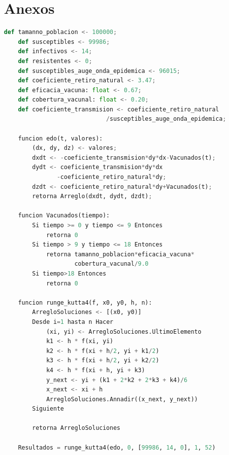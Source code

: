 \documentclass{wscpaperproc}
\theoremstyle{wsc}
\begin{document}
\appendix

\clearpage
\section{Anexos} \label{app:quadratic}
\begin{lstlisting}[language=python]
	def tamanno_poblacion <- 100000;
	def susceptibles <- 99986;
	def infectivos <- 14;
	def resistentes <- 0;
	def susceptibles_auge_onda_epidemica <- 96015;
	def coeficiente_retiro_natural <- 3.47;
	def eficacia_vacuna: float <- 0.67;
	def cobertura_vacunal: float <- 0.20;
	def coeficiente_transmision <- coeficiente_retiro_natural
		                     /susceptibles_auge_onda_epidemica;
	
	funcion edo(t, valores):
	 	(dx, dy, dz) <- valores;
		dxdt <- -coeficiente_transmision*dy*dx-Vacunados(t);
		dydt <- coeficiente_transmision*dy*dx
			   -coeficiente_retiro_natural*dy;
		dzdt <- coeficiente_retiro_natural*dy+Vacunados(t);
		retorna Arreglo(dxdt, dydt, dzdt);
	
	funcion Vacunados(tiempo):
		Si tiempo >= 0 y tiempo <= 9 Entonces
			retorna 0
		Si tiempo > 9 y tiempo <= 18 Entonces
			retorna tamanno_poblacion*eficacia_vacuna*
					cobertura_vacunal/9.0
		Si tiempo>18 Entonces
			retorna 0
	
	funcion runge_kutta4(f, x0, y0, h, n):
		ArregloSoluciones <- [(x0, y0)]
		Desde i=1 hasta n Hacer
			(xi, yi) <- ArregloSoluciones.UltimoElemento
			k1 <- h * f(xi, yi)
			k2 <- h * f(xi + h/2, yi + k1/2)
			k3 <- h * f(xi + h/2, yi + k2/2)
			k4 <- h * f(xi + h, yi + k3)
			y_next <- yi + (k1 + 2*k2 + 2*k3 + k4)/6
			x_next <- xi + h
			ArregloSoluciones.Annadir((x_next, y_next))
		Siguiente	

		retorna ArregloSoluciones

	Resultados = runge_kutta4(edo, 0, [99986, 14, 0], 1, 52)

\end{lstlisting}
\end{document}
